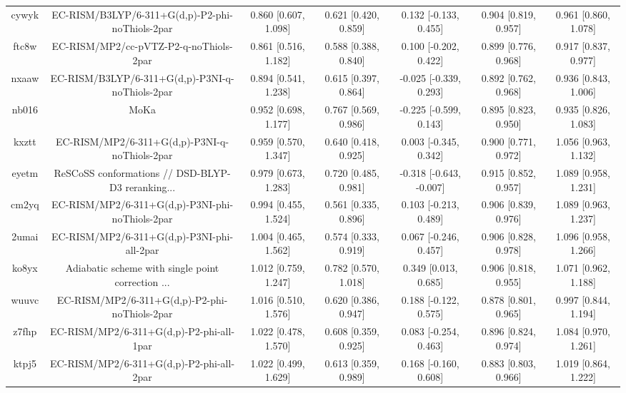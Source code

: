 \documentclass{article}
\begin{document}
\begin{center}
\begin{longtable}{|ccccccc|}
 cywyk &    EC-RISM/B3LYP/6-311+G(d,p)-P2-phi-noThiols-2par &  0.860 [0.607, 1.098] &  0.621 [0.420, 0.859] &    0.132 [-0.133, 0.455] &  0.904 [0.819, 0.957] &   0.961 [0.860, 1.078] \\
 ftc8w &             EC-RISM/MP2/cc-pVTZ-P2-q-noThiols-2par &  0.861 [0.516, 1.182] &  0.588 [0.388, 0.840] &    0.100 [-0.202, 0.422] &  0.899 [0.776, 0.968] &   0.917 [0.837, 0.977] \\
 nxaaw &    EC-RISM/B3LYP/6-311+G(d,p)-P3NI-q-noThiols-2par &  0.894 [0.541, 1.238] &  0.615 [0.397, 0.864] &   -0.025 [-0.339, 0.293] &  0.892 [0.762, 0.968] &   0.936 [0.843, 1.006] \\
 nb016 &                                               MoKa &  0.952 [0.698, 1.177] &  0.767 [0.569, 0.986] &   -0.225 [-0.599, 0.143] &  0.895 [0.823, 0.950] &   0.935 [0.826, 1.083] \\
 kxztt &      EC-RISM/MP2/6-311+G(d,p)-P3NI-q-noThiols-2par &  0.959 [0.570, 1.347] &  0.640 [0.418, 0.925] &    0.003 [-0.345, 0.342] &  0.900 [0.771, 0.972] &   1.056 [0.963, 1.132] \\
 eyetm &  ReSCoSS conformations // DSD-BLYP-D3 reranking... &  0.979 [0.673, 1.283] &  0.720 [0.485, 0.981] &  -0.318 [-0.643, -0.007] &  0.915 [0.852, 0.957] &   1.089 [0.958, 1.231] \\
 cm2yq &    EC-RISM/MP2/6-311+G(d,p)-P3NI-phi-noThiols-2par &  0.994 [0.455, 1.524] &  0.561 [0.335, 0.896] &    0.103 [-0.213, 0.489] &  0.906 [0.839, 0.976] &   1.089 [0.963, 1.237] \\
 2umai &         EC-RISM/MP2/6-311+G(d,p)-P3NI-phi-all-2par &  1.004 [0.465, 1.562] &  0.574 [0.333, 0.919] &    0.067 [-0.246, 0.457] &  0.906 [0.828, 0.978] &   1.096 [0.958, 1.266] \\
 ko8yx &  Adiabatic scheme with single point correction ... &  1.012 [0.759, 1.247] &  0.782 [0.570, 1.018] &     0.349 [0.013, 0.685] &  0.906 [0.818, 0.955] &   1.071 [0.962, 1.188] \\
 wuuvc &      EC-RISM/MP2/6-311+G(d,p)-P2-phi-noThiols-2par &  1.016 [0.510, 1.576] &  0.620 [0.386, 0.947] &    0.188 [-0.122, 0.575] &  0.878 [0.801, 0.965] &   0.997 [0.844, 1.194] \\
 z7fhp &           EC-RISM/MP2/6-311+G(d,p)-P2-phi-all-1par &  1.022 [0.478, 1.570] &  0.608 [0.359, 0.925] &    0.083 [-0.254, 0.463] &  0.896 [0.824, 0.974] &   1.084 [0.970, 1.261] \\
 ktpj5 &           EC-RISM/MP2/6-311+G(d,p)-P2-phi-all-2par &  1.022 [0.499, 1.629] &  0.613 [0.359, 0.989] &    0.168 [-0.160, 0.608] &  0.883 [0.803, 0.966] &   1.019 [0.864, 1.222] \\

\end{longtable}
\end{center}
\end{document}
